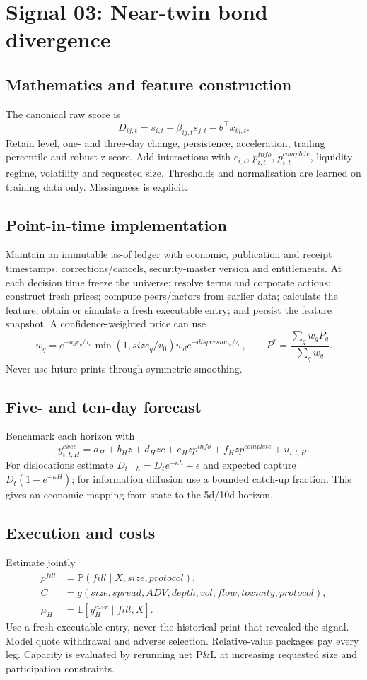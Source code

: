 \documentclass[10pt]{article}
\newcommand{\E}{\mathbb{E}}\newcommand{\Pp}{\mathbb{P}}
\begin{document}
\section{Signal 03: Near-twin bond divergence}
\subsection{Mathematics and feature construction}
The canonical raw score is
\begin{equation}D_{ij,t}=s_{i,t}-\beta_{ij,t}s_{j,t}-\theta^\top x_{ij,t}.\end{equation}
Retain level, one- and three-day change, persistence, acceleration, trailing percentile and robust z-score. Add interactions with $c_{i,t}$, $p^{info}_{i,t}$, $p^{complete}_{i,t}$, liquidity regime, volatility and requested size. Thresholds and normalisation are learned on training data only. Missingness is explicit.

\subsection{Point-in-time implementation}
Maintain an immutable as-of ledger with economic, publication and receipt timestamps, corrections/cancels, security-master version and entitlements. At each decision time freeze the universe; resolve terms and corporate actions; construct fresh prices; compute peers/factors from earlier data; calculate the feature; obtain or simulate a fresh executable entry; and persist the feature snapshot. A confidence-weighted price can use
\[w_q=e^{-age_q/\tau_a}\min(1,size_q/v_0)w_d e^{-dispersion_q/\tau_\sigma},\qquad P^*=\frac{\sum_qw_qP_q}{\sum_qw_q}.\]
Never use future prints through symmetric smoothing.

\subsection{Five- and ten-day forecast}
Benchmark each horizon with
\[y^{exec}_{i,t,H}=a_H+b_Hz+d_Hzc+e_Hzp^{info}+f_Hzp^{complete}+u_{i,t,H}.\]
For dislocations estimate $D_{t+h}=D_te^{-\kappa h}+\epsilon$ and expected capture $D_t(1-e^{-\kappa H})$; for information diffusion use a bounded catch-up fraction. This gives an economic mapping from state to the 5d/10d horizon.

\subsection{Execution and costs}
Estimate jointly
\begin{align}
p^{fill}&=\Pp(fill\mid X,size,protocol),\\
C&=g(size,spread,ADV,depth,vol,flow,toxicity,protocol),\\
\mu_H&=\E[y^{exec}_H\mid fill,X].
\end{align}
Use a fresh executable entry, never the historical print that revealed the signal. Model quote withdrawal and adverse selection. Relative-value packages pay every leg. Capacity is evaluated by rerunning net P\&L at increasing requested size and participation constraints.
\end{document}
